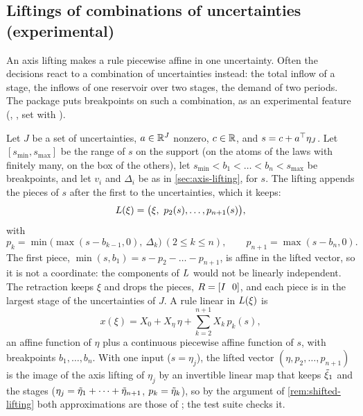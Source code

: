 \subsection{Liftings of combinations of uncertainties (experimental)}
\label{sec:combination-lifting}

An axis lifting makes a rule piecewise affine in one uncertainty.
Often the decisions react to a combination of uncertainties instead:
the total inflow of a stage, the inflows of one reservoir over two stages, the demand of two periods.
The package puts breakpoints on such a combination, as an experimental feature
(, , set with ).

Let $J$ be a set of uncertainties, $a \in \mathbb{R}^J$ nonzero, $c \in \mathbb{R}$, and $s = c + a^\top\eta_J$.
Let $[s_{\min}, s_{\max}]$ be the range of $s$ on the support
(on the atoms of the laws with finitely many, on the box of the others),
let $s_{\min} < b_1 < \dots < b_n < s_{\max}$ be breakpoints,
and let $v_i$ and $\Delta_i$ be as in \cref{sec:axis-lifting}, for $s$.
The lifting appends the pieces of $s$ after the first to the uncertainties, which it keeps:
\[
L(\xi) = \bigl(\xi,\ p_2(s), \dots, p_{n+1}(s)\bigr),
\]
with
\[
p_k = \min\bigl(\max(s - b_{k-1}, 0),\ \Delta_k\bigr) \ (2 \le k \le n), \qquad
p_{n+1} = \max(s - b_n, 0).
\]
The first piece, $\min(s, b_1) = s - p_2 - \dots - p_{n+1}$, is affine in the lifted vector,
so it is not a coordinate: the components of $L$ would not be linearly independent.
The retraction keeps $\xi$ and drops the pieces, $\Retr = [\eye\ \ 0]$,
and each piece is in the largest stage of the uncertainties of $J$.
A rule linear in $L(\xi)$ is
\[
x(\xi) = X_0 + X_\eta\,\eta + \textstyle\sum_{k=2}^{n+1} X_k\,p_k(s),
\]
an affine function of $\eta$ plus a continuous piecewise affine function of $s$, with breakpoints $b_1, \dots, b_n$.
With one input ($s = \eta_j$), the lifted vector $(\eta, p_2, \dots, p_{n+1})$ is the image of the axis lifting of $\eta_j$
by an invertible linear map that keeps $\tilde\xi_1$ and the stages ($\eta_j = \tilde\eta_1 + \dots + \tilde\eta_{n+1}$, $p_k = \tilde\eta_k$),
so by the argument of \cref{rem:shifted-lifting} both approximations are those of ;
the test suite checks it.

